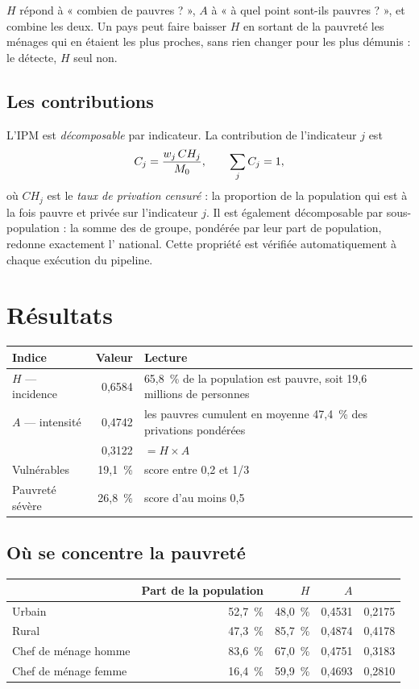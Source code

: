 \documentclass[11pt,a4paper]{article}
\begin{document}
$H$ répond à « combien de pauvres ? », $A$ à « à quel point sont-ils pauvres ? », et \ipm{} combine
les deux. Un pays peut faire baisser $H$ en sortant de la pauvreté les ménages qui en étaient les
plus proches, sans rien changer pour les plus démunis : \ipm{} le détecte, $H$ seul non.

\subsection{Les contributions}

L'IPM est \emph{décomposable} par indicateur. La contribution de l'indicateur $j$ est
\[
C_j = \frac{w_j \, CH_j}{M_{0}}, \qquad \sum_j C_j = 1,
\]
où $CH_j$ est le \emph{taux de privation censuré} : la proportion de la population qui est à la
fois pauvre et privée sur l'indicateur $j$. Il est également décomposable par sous-population :
la somme des \ipm{} de groupe, pondérée par leur part de population, redonne exactement l'\ipm{}
national. Cette propriété est vérifiée automatiquement à chaque exécution du pipeline.

\section{Résultats}

\begin{center}
\begin{tabular}{@{}lrl@{}}
\toprule
\textbf{Indice} & \textbf{Valeur} & \textbf{Lecture} \\
\midrule
$H$ --- incidence & 0,6584 & 65,8~\% de la population est pauvre, soit 19,6 millions de personnes \\
$A$ --- intensité & 0,4742 & les pauvres cumulent en moyenne 47,4~\% des privations pondérées \\
\ipm{} & 0,3122 & $= H \times A$ \\
Vulnérables & 19,1~\% & score entre 0,2 et 1/3 \\
Pauvreté sévère & 26,8~\% & score d'au moins 0,5 \\
\bottomrule
\end{tabular}
\end{center}

\subsection{Où se concentre la pauvreté}

\begin{center}
\begin{tabular}{@{}lrrrr@{}}
\toprule
& \textbf{Part de la population} & \textbf{$H$} & \textbf{$A$} & \textbf{\ipm{}} \\
\midrule
Urbain & 52,7~\% & 48,0~\% & 0,4531 & 0,2175 \\
Rural  & 47,3~\% & 85,7~\% & 0,4874 & 0,4178 \\
\midrule
Chef de ménage homme & 83,6~\% & 67,0~\% & 0,4751 & 0,3183 \\
Chef de ménage femme & 16,4~\% & 59,9~\% & 0,4693 & 0,2810 \\
\bottomrule
\end{tabular}
\end{center}
\end{document}

